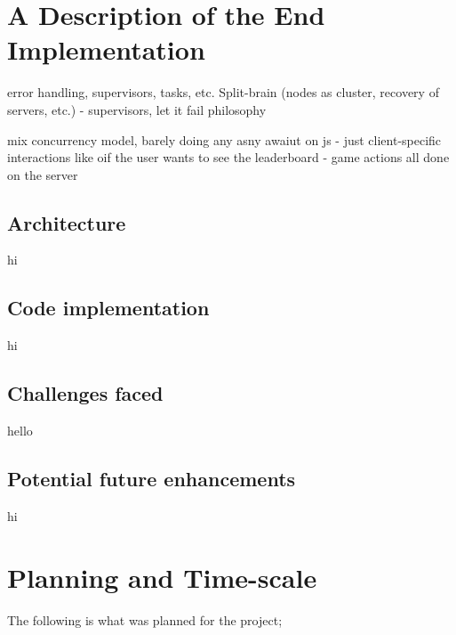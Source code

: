 \documentclass[]{final}
\begin{document}

\chapter{A Description of the End Implementation}

error handling, supervisors, tasks, etc.
Split-brain (nodes as cluster, recovery of servers, etc.) - supervisors, let it fail philosophy

mix concurrency model, barely doing any asny awaiut on js - just client-specific
interactions like oif the user wants to see the leaderboard - game actions all done on the server
\section{Architecture}
hi%
\section{Code implementation}
hi%
\section{Challenges faced}
hello%
\section{Potential future enhancements}
hi%

\chapter{Planning and Time-scale}

The following is what was planned for the project;
\end{document}
